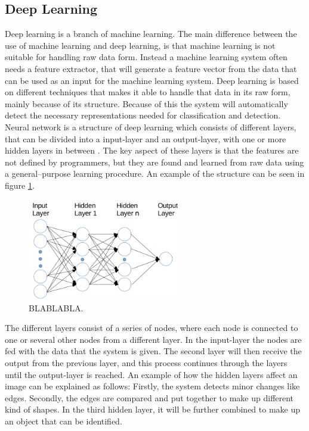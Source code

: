 \subsection{Deep Learning}
Deep learning is a branch of machine learning. The main difference between the use of machine learning and deep learning, is that machine learning is not suitable for handling raw data form. Instead a machine learning system often needs a feature extractor, that will generate a feature vector from the data that can be used as an input for the machine learning system.
Deep learning is based on different techniques that makes it able to handle that data in its raw form, mainly because of its structure.\citep{LeCun2015, Schmidhuber2015} Because of this the system will automatically detect the necessary representations needed for classification and detection. Neural network is a structure of deep learning which consists of different layers, that can be divided into a input-layer and an output-layer, with one or more hidden layers in between \citep{Schmidhuber2015}. The key aspect of these layers is that the features are not defined by programmers, but they are found and learned from raw data using a general–purpose learning procedure.\citep{LeCun2015} An example of the structure can be seen in figure \ref{fig:NN_structure}.   


\begin{figure} [H]
\centering
\includegraphics[width=0.6\textwidth]{figures/NN_structure}
\caption{BLABLABLA\citep{Acquarelli2017}.}
\label{fig:NN_structure}  
\end{figure}

\noindent
The different layers consist of a series of nodes, where each node is connected to one or several other nodes from a different layer. In the input-layer the nodes are fed with the data that the system is given. The second layer will then receive the output from the previous layer, and this process continues through the layers until the output-layer is reached.\citep{Schmidhuber2015} An example of how the hidden layers affect an image can be explained as follows:  
Firstly, the system detects minor changes like edges. Secondly, the edges are compared and put together to make up different kind of shapes. In the third hidden layer, it will be further combined to make up an object that can be identified.\citep{LeCun2015}

